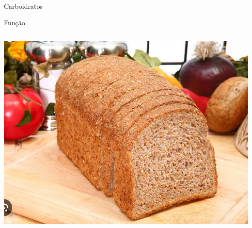 \documentclass[presentation]{beamer}
\begin{document}
\begin{frame}[label={sec:org524b6ef}]{Carboidratos}
\begin{block}{Função}
\begin{columns}
\begin{column}{0.45\columnwidth}
\begin{block}{}
\begin{itemize}
\begin{center}
\includegraphics[scale=0.2]{./pao.png}
\end{center}
\end{itemize}
\end{block}
\end{column}
\end{columns}
\end{block}
\end{frame}
\end{document}

